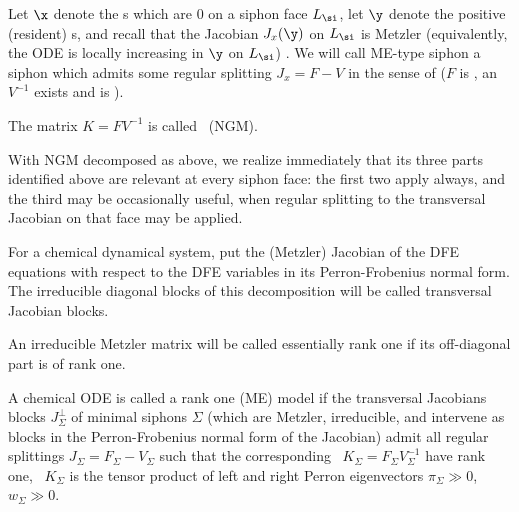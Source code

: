 \label{d:VdD}
Let $\x$ denote the \var s which are $0$ on a siphon face $L_\si$,  let  $\y$ denote the positive (resident) \var s, and recall that the Jacobian $J_x(\y)$ on $L_\si$ is Metzler (equivalently, the ODE is locally  increasing in $\y$ on $L_\si$)  \cite{AAH26,AAHK}. We will call ME-type siphon a siphon which     admits some regular splitting  $J_x=F-V$
in the sense of \cite{Varga,Van} ($F$ is \nne, an $V^{-1}$ exists and is \nne).

The matrix $K=F V^{-1}$ is called \NGM\ (NGM).
\eeD

With NGM decomposed as above, we realize immediately that its three parts identified above are relevant at every siphon face: the first two apply always, and the third may be occasionally useful, when regular splitting to the transversal Jacobian
on that face may be  applied.
\eeR

\label{d:tJb}
For a chemical dynamical system, put  the (Metzler) Jacobian of the  DFE equations with respect to the DFE variables in its Perron-Frobenius normal form.  The irreducible diagonal blocks of this decomposition will be called transversal Jacobian blocks.
\eeD


An irreducible Metzler matrix will be called essentially rank one if its off-diagonal
part is of  rank one. \eeD






 A chemical  ODE is called a rank one (ME) model if the
transversal
 Jacobians blocks $J_\Sigma^\perp$ of minimal siphons $\Sigma$ (which  are  Metzler, irreducible, and intervene as blocks in the Perron-Frobenius normal form of the Jacobian) admit all regular splittings $J_\Sigma=F_\Sigma-V_\Sigma$  such that the corresponding \NGM\  $K_\Sigma=F_\Sigma V_\Sigma^{-1}$  have rank one, \ie\   $K_\Sigma$ is the tensor product
 of  left and right  Perron
eigenvectors  $\pi_\Sigma\gg0$,
 $w_\Sigma\gg0$.

